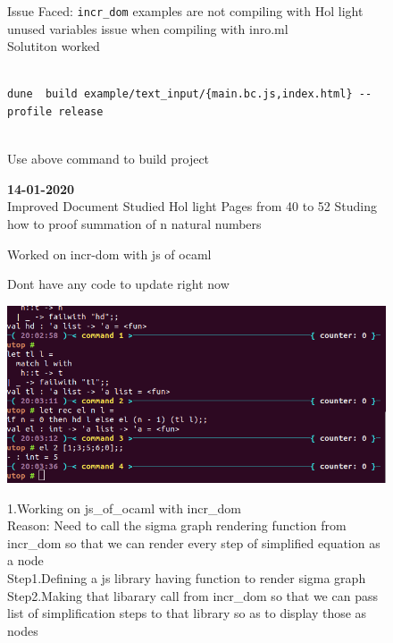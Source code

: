 \documentclass[15]{article}
\begin{document}
\begin{figure}
Issue Faced:
\texttt{incr\_dom} examples are not compiling with Hol light
\\ 
 unused variables issue when compiling with inro.ml
 \\
 Solutiton worked
\\ 
\begin{verbatim}

dune  build example/text_input/{main.bc.js,index.html} --profile release
\end{verbatim}
\\
Use above command to build project

\textbf{14-01-2020}\\

Improved Document 
Studied Hol light Pages from 40 to 52 Studing how to proof summation of n natural numbers

Worked on incr-dom with js of ocaml 

Dont have any code to update right now


\includegraphics[scale = .5]{images/image8.png}


1.Working on js_of_ocaml with incr_dom\\
Reason: Need to call the sigma graph rendering function from incr_dom so that we can render every step of simplified equation as a node\\
Step1.Defining a js library having function to render sigma graph\\
Step2.Making that libarary call from incr_dom so that we can pass list of simplification steps to that library so as to display those as nodes\\


\end{figure}
\end{document}
